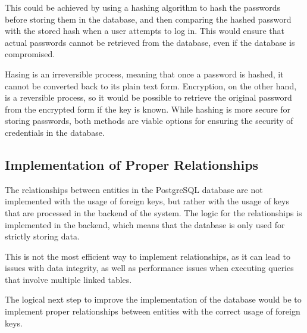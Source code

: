 This could be achieved by using a hashing algorithm to hash the passwords before storing them in the database, and then comparing the hashed password with the stored hash when a user attempts to log in. This would ensure that actual passwords cannot be retrieved from the database, even if the database is compromised.

Hasing is an irreversible process, meaning that once a password is hashed, it cannot be converted back to its plain text form. Encryption, on the other hand, is a reversible process, so it would be possible to retrieve the original password from the encrypted form if the key is known. While hashing is more secure for storing passwords, both methods are viable options for ensuring the security of credentials in the database.

\subsection{Implementation of Proper Relationships}

The relationships between entities in the PostgreSQL database are not implemented with the usage of foreign keys, but rather with the usage of keys that are processed in the backend of the system. The logic for the relationships is implemented in the backend, which means that the database is only used for strictly storing data. 

This is not the most efficient way to implement relationships, as it can lead to issues with data integrity, as well as performance issues when executing queries that involve multiple linked tables.

The logical next step to improve the implementation of the database would be to implement proper relationships between entities with the correct usage of foreign keys. 